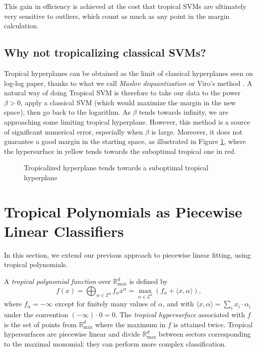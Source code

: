 \documentclass[oneside,UKenglish,a4paper]{amsart}
\numberwithin{equation}{section}
\numberwithin{figure}{section}
\theoremstyle{plain}
\theoremstyle{definition}
\theoremstyle{plain}
\theoremstyle{remark}
\theoremstyle{plain}
\theoremstyle{definition}
\theoremstyle{definition}
\begin{document}
This gain in efficiency is achieved at the cost that tropical SVMs are ultimately very sensitive to outliers, which count as much as any point in the margin calculation.

\subsection*{Why not tropicalizing classical SVMs?}

Tropical hyperplanes can be obtained as the limit of classical hyperplanes seen on log-log paper, thanks to what we call \emph{Maslov dequantization} \cite{litvinov2005maslov} or Viro's method \cite{viro2000dequantization}. A natural way of doing Tropical SVM is therefore to take our data to the power $\beta > 0$, apply a classical SVM (which would maximize the margin in the new space), then go back to the logarithm. As $\beta$ tends towards infinity, we are approaching some limiting tropical hyperplane. However, this method is a source of significant numerical error, especially when $\beta$ is large. Moreover, it does not guarantee a good margin in the starting space, as illustrated in Figure \ref{fig:LogLog}, where the hypersurface in yellow tends towards the suboptimal tropical one in red.

\begin{figure}[!h]
    \centering
    \begin{subfigure}{0.5\textwidth}
        \centering
        \resizebox{\linewidth}{!}{%
        \centering
            \clipbox{0.3\width{} 0.3\height{} 0.2\width{} 0.3\height{}}{}}
    \end{subfigure}

    \caption{Tropicalized hyperplane tends towards a suboptimal tropical hyperplane}
    \label{fig:LogLog}
\end{figure}


\section{Tropical Polynomials as Piecewise Linear Classifiers}

In this section, we extend our previous approach to piecewise linear
fitting, using tropical polynomials. 

A \emph{tropical polynomial} \emph{function} over $\mathbb{R}_{\max}^{d}$
is defined by
\[
f(x)=\bigoplus_{\alpha\in\mathbb{Z}^{d}}f_{\alpha}x^{\alpha}=\max_{\alpha\in\mathbb{Z}^{d}}\left(f_{\alpha}+\langle x,\alpha\rangle\right),
\]
where $f_{\alpha}=-\infty$ except for finitely many values of $\alpha$,
and with $\langle x,\alpha\rangle=\sum_{i}x_{i}\cdot\alpha_{i}$ under
the convention $(-\infty)\cdot0=0$. The \emph{tropical hypersurface} associated with $f$ is the set of points from
$\mathbb{R}_{\max}^{d}$ where the maximum in $f$ is attained twice.
Tropical hypersurfaces are piecewise linear and divide $\mathbb{R}_{\max}^{d}$
between sectors corresponding to the maximal monomial: they can perform
more complex classification.
\end{document}
